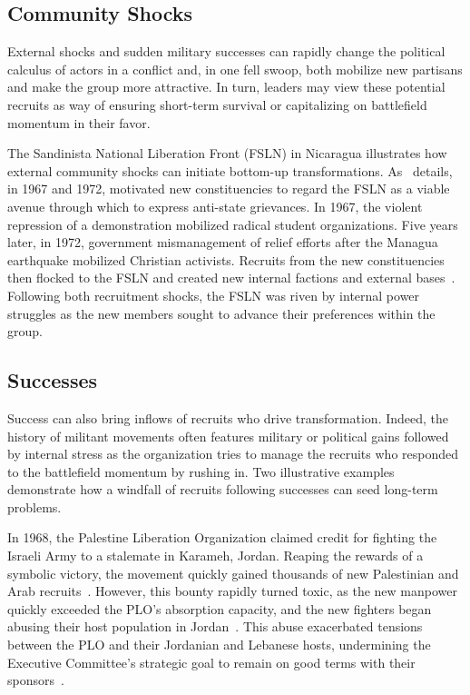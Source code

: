\subsection{Community Shocks}
External shocks and sudden military successes can rapidly change the political calculus of actors in a conflict and, in one fell swoop, both mobilize new partisans and make the group more attractive. In turn, leaders may view these potential recruits as way of ensuring short-term survival or capitalizing on battlefield momentum in their favor. 

The Sandinista National Liberation Front (FSLN) in Nicaragua illustrates how external community shocks can initiate bottom-up transformations. As~\textcite{mosinger2017dissident} details, in 1967 and 1972,  motivated new constituencies to regard the FSLN as a viable avenue through which to express anti-state grievances.  In 1967, the violent repression of a demonstration mobilized radical student organizations. Five years later, in 1972, government mismanagement of relief efforts after the Managua earthquake mobilized Christian activists. Recruits from the new constituencies then flocked to the FSLN and created new internal factions and external bases~\autocite[210]{mosinger2017dissident}. Following both recruitment shocks, the FSLN was riven by internal power struggles as the new members sought to advance their preferences within the group. 

\subsection{Successes}
Success can also bring inflows of recruits who drive transformation. Indeed, the history of militant movements often features military or political gains followed by internal stress as the organization tries to manage the recruits who responded to the battlefield momentum by rushing in. Two illustrative examples demonstrate how a windfall of recruits following successes can seed long-term problems. 

In 1968, the Palestine Liberation Organization claimed credit for fighting the Israeli Army to a stalemate in Karameh, Jordan. Reaping the rewards of a symbolic victory, the movement quickly gained thousands of new Palestinian and Arab recruits~\autocite{sharif2009arafat}. However, this bounty rapidly turned toxic, as the new manpower quickly exceeded the PLO's absorption capacity, and the new fighters began abusing their host population in Jordan~\autocite{szekely2017politics}. This abuse exacerbated tensions between the PLO and their Jordanian and Lebanese hosts, undermining the Executive Committee's strategic goal to remain on good terms with their sponsors~\autocite{szekely2017politics}.

